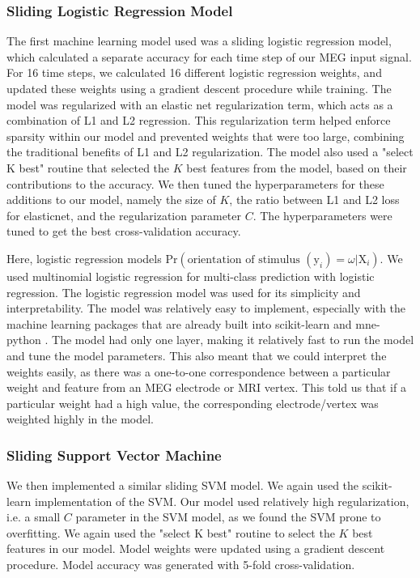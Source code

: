 \documentclass[../main.tex]{subfiles}
\begin{document}
\subsubsection*{Sliding Logistic Regression Model}
The first machine learning model used was a sliding logistic regression model, which calculated a separate accuracy for each time step of our MEG input signal. For 16 time steps, we calculated 16 different logistic regression weights, and updated these weights using a gradient descent procedure while training. The model was regularized with an elastic net regularization term, which acts as a combination of L1 and L2 regression. This regularization term helped enforce sparsity within our model and prevented weights that were too large, combining the traditional benefits of L1 and L2 regularization. The model also used a "select K best" routine that selected the $K$ best features from the model, based on their contributions to the accuracy. We then tuned the hyperparameters for these additions to our model, namely the size of $K$, the ratio between L1 and L2 loss for elasticnet, and the regularization parameter $C$. The hyperparameters were tuned to get the best cross-validation accuracy.

Here, logistic regression models $\mathrm{Pr}(\textrm{orientation of stimulus } (\mathrm{y}_i) = \omega | \mathrm{X}_i)$. We used multinomial logistic regression for multi-class prediction with logistic regression. The logistic regression model was used for its simplicity and interpretability. The model was relatively easy to implement, especially with the machine learning packages that are already built into scikit-learn \citep{scikit-learn} and mne-python \citep{mne}. The model had only one layer, making it relatively fast to run the model and tune the model parameters. This also meant that we could interpret the weights easily, as there was a one-to-one correspondence between a particular weight and feature from an MEG electrode or MRI vertex. This told us that if a particular weight had a high value, the corresponding electrode/vertex was weighted highly in the model.

\subsubsection*{Sliding Support Vector Machine}
We then implemented a similar sliding SVM model. We again used the scikit-learn \citep{scikit-learn} implementation of the SVM. Our model used relatively high regularization, i.e. a small $C$ parameter in the SVM model, as we found the SVM prone to overfitting. We again used the "select K best" routine to select the $K$ best features in our model. Model weights were updated using a gradient descent procedure. Model accuracy was generated with 5-fold cross-validation. 
\end{document}
